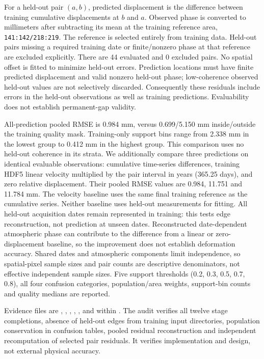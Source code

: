 \documentclass[10pt,a4paper]{article}
\begin{document}
For a held-out pair $(a,b)$, predicted displacement is the difference between training cumulative displacements at $b$ and $a$. Observed phase is converted to millimeters after subtracting its mean at the training reference area, \texttt{141:142/218:219}. The reference is selected entirely from training data. Held-out pairs missing a required training date or finite/nonzero phase at that reference are excluded explicitly. There are 44 evaluated and 0 excluded pairs. No spatial offset is fitted to minimize held-out errors. Prediction locations must have finite predicted displacement and valid nonzero held-out phase; low-coherence observed held-out values are not selectively discarded. Consequently these residuals include errors in the held-out observations as well as training predictions. Evaluability does not establish permanent-gap validity.

All-prediction pooled RMSE is 0.984 mm, versus 0.699/5.150 mm inside/outside the training quality mask. Training-only support bins range from 2.338 mm in the lowest group to 0.412 mm in the highest group. This comparison uses no held-out coherence in its strata. We additionally compare three predictions on identical evaluable observations: cumulative time-series differences, training HDF5 linear velocity multiplied by the pair interval in years (365.25 days), and zero relative displacement. Their pooled RMSE values are 0.984, 11.751 and 11.784 mm. The velocity baseline uses the same final training reference as the cumulative series. Neither baseline uses held-out measurements for fitting. All held-out acquisition dates remain represented in training: this tests edge reconstruction, not prediction at unseen dates. Reconstructed date-dependent atmospheric phase can contribute to the difference from a linear or zero-displacement baseline, so the improvement does not establish deformation accuracy. Shared dates and atmospheric components limit independence, so spatial-pixel sample sizes and pair counts are descriptive denominators, not effective independent sample sizes. Five support thresholds (0.2, 0.3, 0.5, 0.7, 0.8), all four confusion categories, population/area weights, support-bin counts and quality medians are reported.

Evidence files are , , , , ,  and  within . The audit verifies all twelve stage completions, absence of held-out edges from training input directories, population conservation in confusion tables, pooled residual reconstruction and independent recomputation of selected pair residuals. It verifies implementation and design, not external physical accuracy.
\end{document}
